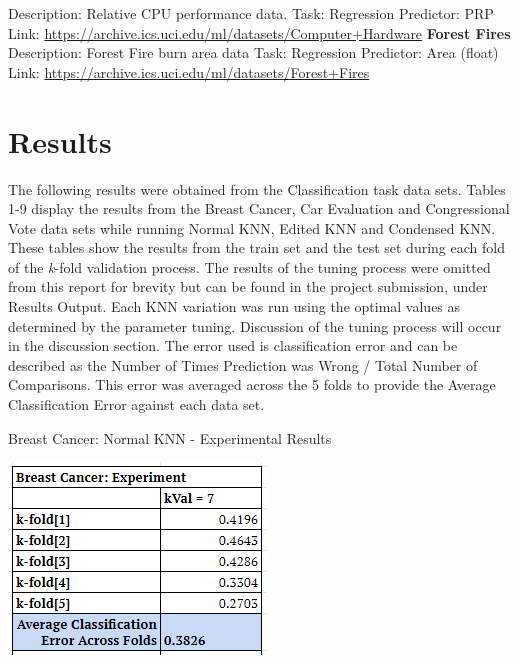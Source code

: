 \documentclass[twoside,11pt]{article}
\begin{document}
Description: Relative CPU performance data.\newline
Task: Regression\newline
Predictor: PRP\newline
Link: \newline
\url{https://archive.ics.uci.edu/ml/datasets/Computer+Hardware}\newline
{\noindent}\textbf{Forest Fires}\newline
Description: Forest Fire burn area data\newline
Task: Regression\newline
Predictor: Area (float)\newline
Link: \newline
\url{https://archive.ics.uci.edu/ml/datasets/Forest+Fires}\newline
	
\newpage

\section{Results}
The following results were obtained from the Classification task data sets.
Tables 1-9 display the results from the Breast Cancer, Car Evaluation and Congressional Vote data sets while running Normal KNN, Edited KNN and Condensed KNN. These tables show the results from the train set and the test set during each fold of the \textit{k}-fold validation process. The results of the tuning process were omitted from this report for brevity but can be found in the project submission, under Results Output. Each KNN variation was run using the optimal values as determined by the parameter tuning. Discussion of the tuning process will occur in the discussion section. The error used is classification error and can be described as the Number of Times Prediction was Wrong / Total Number of Comparisons. This error was averaged across the 5 folds to provide the Average Classification Error against each data set. 

\begin{table}[h!]
	\begin{center}
		\caption{Breast Cancer: Normal KNN - Experimental Results}
		\label{tab:table1}
		\includegraphics[scale=.7]{BC_Results_NKNN}\newline
	\end{center}
\end{table}
\end{document}
